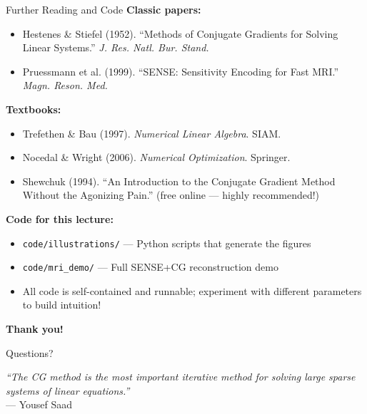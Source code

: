 \documentclass[aspectratio=169]{beamer}
\begin{document}
\begin{frame}{Further Reading and Code}
    \textbf{Classic papers:}
    \begin{itemize}
        \item Hestenes \& Stiefel (1952). ``Methods of Conjugate Gradients for Solving
              Linear Systems.'' \textit{J. Res. Natl. Bur. Stand.}
        \item Pruessmann et al. (1999). ``SENSE: Sensitivity Encoding for Fast MRI.''
              \textit{Magn. Reson. Med.}
    \end{itemize}

    \vspace{0.2cm}
    \textbf{Textbooks:}
    \begin{itemize}
        \item Trefethen \& Bau (1997). \textit{Numerical Linear Algebra}. SIAM.
        \item Nocedal \& Wright (2006). \textit{Numerical Optimization}. Springer.
        \item Shewchuk (1994). ``An Introduction to the Conjugate Gradient Method
              Without the Agonizing Pain.'' (free online --- highly recommended!)
    \end{itemize}

    \vspace{0.2cm}
    \textbf{Code for this lecture:}
    \begin{itemize}
        \item \texttt{code/illustrations/} --- Python scripts that generate the figures
        \item \texttt{code/mri\_demo/} --- Full SENSE+CG reconstruction demo
        \item All code is self-contained and runnable; experiment with different
              parameters to build intuition!
    \end{itemize}
\end{frame}

\begin{frame}
    \centering
    \Huge
    \textbf{Thank you!}

    \vspace{1cm}
    \Large
    Questions?

    \vspace{1.5cm}
    \normalsize
    \textit{``The CG method is the most important iterative method for solving
    large sparse systems of linear equations.''}
    \\
    --- Yousef Saad
\end{frame}
\end{document}
